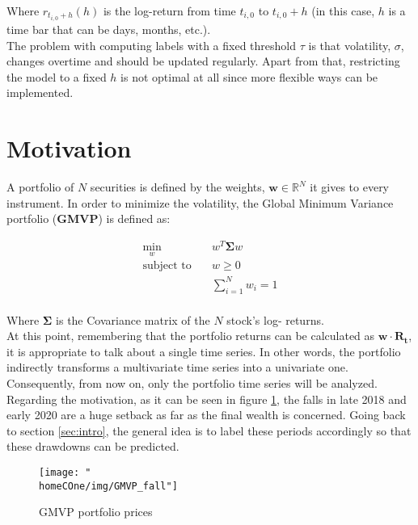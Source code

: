 \documentclass[a4paper]{report}
\newcommand{\homeCOne}{../../Chapter 1 - Metalabeling/Draft}
\begin{document}
Where $r_{t_{i, 0} + h}(h)$ is the log-return from time $t_{i, 0}$ to 
$t_{i, 0} + h$ (in this case, $h$ is a time bar that can be days, months, 
etc.).\\

The problem with computing labels with a fixed threshold $\tau$ is that 
volatility, $\sigma$, changes overtime and should be updated regularly. Apart 
from that, restricting the model to a fixed $h$ is not optimal at all since 
more flexible ways can be implemented.

\section{Motivation}
\label{sec:motiv}
A portfolio of $N$ securities is defined by the weights, $\textbf{w} 
\in \mathbb{R}^N$ it gives to every instrument. In order to minimize 
the volatility, the Global Minimum Variance portfolio (\textbf{GMVP}) 
is defined as:

\begin{equation}
	\begin{aligned}
		\min_{w} \quad & w^{T} \mathbf{\Sigma} w\\
		\textrm{subject to} \quad & w \geq 0\\
 		 & \sum_{i = 1}^{N} w_i = 1    \\
	\end{aligned}
\end{equation}

Where $\mathbf{\Sigma}$ is the Covariance matrix of the $N$ stock's log-
returns.\\

At this point, remembering that the portfolio returns can be calculated as 
$\textbf{w} \cdot \mathbf{R_{t}}$, it is appropriate to talk about a 
single time series. In other words, the portfolio indirectly 
transforms a multivariate time series into a univariate one. 
Consequently, from now on, only the portfolio time series will be 
analyzed.\\ 

Regarding the motivation, as it can be seen in figure \ref{fig:GMVP_fall}, 
the falls in late 2018 and early 2020 are a huge setback as far as the final 
wealth is concerned. Going back to section \ref{sec:intro}, the general idea 
is to label these periods accordingly so that these drawdowns can be 
predicted.\\

\begin{figure}[htbp]
	\centering
	\texttt{[image: "\\homeCOne/img/GMVP\_fall"]}
	\caption{GMVP portfolio prices}
	\label{fig:GMVP_fall}
\end{figure}
\end{document}
